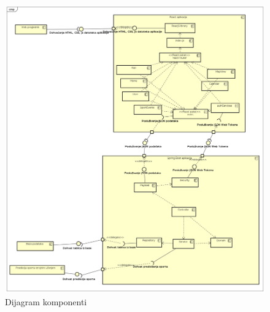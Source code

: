 			\begin{figure}[H]
				\includegraphics[width=\textwidth]{dijagrami/ComponentDiagram0.png}
				\caption{Dijagram komponenti}
			\end{figure}
		
			\eject
%		
%		
